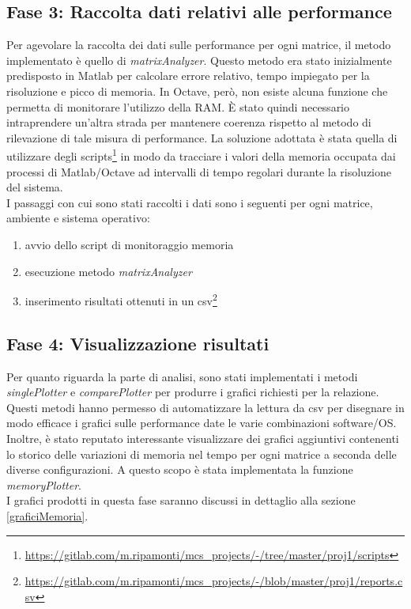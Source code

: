 \subsection{Fase 3: Raccolta dati relativi alle performance}\label{fase3}
Per agevolare la raccolta dei dati sulle performance per ogni matrice, il metodo implementato è quello di \emph{matrixAnalyzer}. 
Questo metodo era stato inizialmente predisposto in Matlab per calcolare errore relativo, tempo impiegato per la risoluzione e picco di memoria. 
In Octave, però, non esiste alcuna funzione che permetta di monitorare l'utilizzo della RAM. È stato quindi necessario intraprendere un'altra 
strada per mantenere coerenza rispetto al metodo di rilevazione di tale misura di performance. La soluzione adottata è stata quella di utilizzare 
degli scripts\footnote{\url{https://gitlab.com/m.ripamonti/mcs_projects/-/tree/master/proj1/scripts}} in modo da tracciare i valori della memoria occupata dai 
processi di Matlab/Octave ad intervalli di tempo regolari durante la risoluzione del sistema. \\
I passaggi con cui sono stati raccolti i dati sono i seguenti per ogni matrice, ambiente e sistema operativo:
\begin{enumerate}
    \item avvio dello script di monitoraggio memoria
    \item esecuzione metodo \emph{matrixAnalyzer}
    \item inserimento risultati ottenuti in un csv\footnote{\url{https://gitlab.com/m.ripamonti/mcs_projects/-/blob/master/proj1/reports.csv}}
\end{enumerate} 


\subsection{Fase 4: Visualizzazione risultati}
Per quanto riguarda la parte di analisi, sono stati implementati i metodi \emph{singlePlotter} e \emph{comparePlotter} per produrre i grafici richiesti
per la relazione. Questi metodi hanno permesso di automatizzare la lettura da csv per disegnare in modo efficace i grafici sulle performance date le varie 
combinazioni software/OS. \\ %
Inoltre, è stato reputato interessante visualizzare dei grafici aggiuntivi contenenti lo storico delle variazioni di memoria nel tempo per ogni matrice 
a seconda delle diverse configurazioni. A questo scopo è stata implementata la funzione \emph{memoryPlotter}. \\
I grafici prodotti in questa fase saranno discussi in dettaglio alla sezione \ref{graficiMemoria}. 





